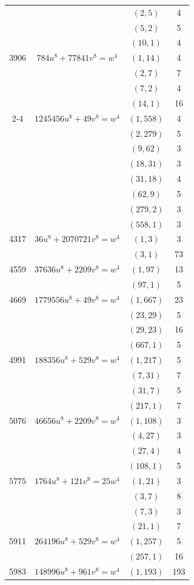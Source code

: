 \documentclass[a4paper,12pt,english,reqno]{amsart}
\begin{document}
\begin{center}
\begin{longtable}{|c|c|c|c|}
&& $(2,5)$ & 4 \\
&& $(5,2)$ & 5 \\
&& $(10,1)$ & 4 \\\hline
3906 & $ 784 u^8 +77841 v^8=w^4$ & $(1,14)$ & 4 \\
&& $(2,7)$ & 7 \\
&& $(7,2)$ & 4 \\
&& $(14,1)$ & 16 \\\cline{2-4}
& $1245456 u^8 + 49 v^8 =w^4$ & $(1,558)$ & 4 \\
&& $(2,279)$ & 5 \\
&& $(9,62)$ & 3 \\
&& $(18,31)$ & 3 \\
&& $(31,18)$ & 4 \\
&& $(62,9)$ & 5 \\
&& $(279,2)$ & 3 \\
&& $(558,1)$ & 3 \\\hline
4317 & $36 u^8+ 2070721v^8= w^4$ & $(1,3)$ & 3 \\
&& $(3,1)$ & 73 \\\hline
4559 & $37636 u^8 + 2209 v^8= w^4$ & $(1,97)$ & 13 \\
&& $(97,1)$ & 5 \\\hline
4669 & $1779556u^8+49v^8= w^4$ & $(1,667)$ & 23 \\
&& $(23,29)$ & 5 \\
&& $(29,23)$ & 16 \\
&& $(667,1)$ & 5 \\\hline
4991 & $188356 u^8 + 529 v^8=  w^4$ & $(1,217)$ & 5 \\
&& $(7,31)$ & 7 \\
&& $(31,7)$ & 5 \\
&& $(217,1)$ & 7 \\\hline
$5076$ & $46656 u^8 + 2209 v^8=  w^4$ & $(1,108)$ & 3 \\
&& $(4,27)$ & 3 \\
&& $(27,4)$ & 4 \\
&& $(108,1)$ & 5 \\\hline
$5775$ & $1764 u^8 + 121 v^8=25  w^4$ & $(1,21)$ & 3 \\
&& $(3,7)$ & 8 \\
&& $(7,3)$ & 3 \\
&& $(21,1)$ & 7 \\\hline
5911 & $264196 u^8 + 529 v^8 =w^4$ & $(1,257)$ & 5 \\
&& $(257,1)$ & 16 \\\hline
5983 & $148996 u^8 + 961 v^8= w^4$ & $(1,193)$ & 193 \\

\end{longtable}
\end{center}
\end{document}
